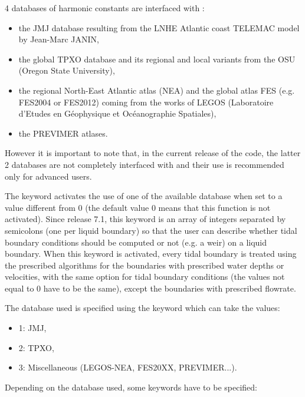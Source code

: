 4 databases of harmonic constants are interfaced with :

\begin{itemize}
\item the JMJ database resulting from the LNHE Atlantic coast TELEMAC model by
Jean-Marc JANIN,

\item the global TPXO database and its regional and local variants from the OSU
(Oregon State University),

\item the regional North-East Atlantic atlas (NEA) and the global atlas FES
(e.g. FES2004 or FES2012) coming from the works of LEGOS
(Laboratoire d'Etudes en G\'{e}ophysique et Oc\'{e}anographie Spatiales),

\item the PREVIMER atlases.
\end{itemize}

However it is important to note that, in the current release of the code,
the latter 2 databases are not completely interfaced with 
and their use is recommended only for advanced users.

The keyword  activates the use of
one of the available database when set to a value different from 0
(the default value 0 means that this function is not activated).
Since release 7.1, this keyword is an array of integers separated by semicolons
(one per liquid boundary) so that the user can describe whether tidal boundary
conditions should be computed or not (e.g. a weir) on a liquid boundary.
When this keyword is activated, every tidal
boundary is treated using the prescribed algorithms for the boundaries with
prescribed water depths or velocities, with the same option for tidal boundary
conditions (the values not equal to 0 have to be the same),
except the boundaries with prescribed flowrate.

The database used is specified using the keyword 
which can take the values:

\begin{itemize}
\item 1: JMJ,

\item 2: TPXO,

\item 3: Miscellaneous (LEGOS-NEA, FES20XX, PREVIMER...).
\end{itemize}

Depending on the database used, some keywords have to be specified:

